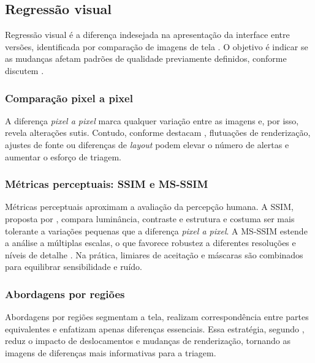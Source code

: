 \documentclass{UNESC}
\begin{document}
\subsection{Regressão visual}

Regressão visual é a diferença indesejada na apresentação da interface entre versões, identificada por comparação de imagens de tela \cite{tanno2020,figueiredo2018,bordignon2019,tanoue2018vrt}. O objetivo é indicar se as mudanças afetam padrões de qualidade previamente definidos, conforme discutem .

\subsubsection{Comparação pixel a pixel}
A diferença \emph{pixel a pixel} marca qualquer variação entre as imagens e, por isso, revela alterações sutis. Contudo, conforme destacam , flutuações de renderização, ajustes de fonte ou diferenças de \emph{layout} podem elevar o número de alertas e aumentar o esforço de triagem.

\subsubsection{Métricas perceptuais: SSIM e MS-SSIM}
Métricas perceptuais aproximam a avaliação da percepção humana. A SSIM, proposta por , compara luminância, contraste e estrutura e costuma ser mais tolerante a variações pequenas que a diferença \emph{pixel a pixel}. A MS-SSIM estende a análise a múltiplas escalas, o que favorece robustez a diferentes resoluções e níveis de detalhe \cite{wang2003msssim}. Na prática, limiares de aceitação e máscaras são combinados para equilibrar sensibilidade e ruído.

\subsubsection{Abordagens por regiões}
Abordagens por regiões segmentam a tela, realizam correspondência entre partes equivalentes e enfatizam apenas diferenças essenciais. Essa estratégia, segundo , reduz o impacto de deslocamentos e mudanças de renderização, tornando as imagens de diferenças mais informativas para a triagem.
\end{document}
